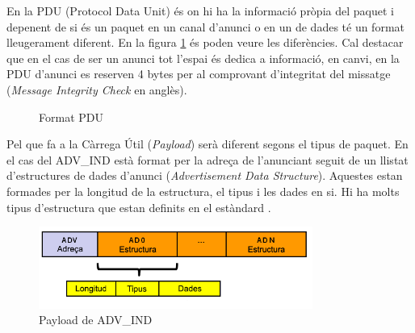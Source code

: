 En la PDU (Protocol Data Unit) és on hi ha la informació pròpia del paquet i depenent de si és un paquet en un canal d'anunci o en un de dades té un format lleugerament diferent.
En la figura \ref{fig:pdu_format} és poden veure les diferències.
Cal destacar que en el cas de ser un anunci tot l'espai és dedica a informació, en canvi, en la PDU d'anunci es reserven 4 bytes per al comprovant d'integritat del missatge (\textit{Message Integrity Check} en anglès).

\begin{figure}[!h]
	\begin{center}
		\begin{subfigmatrix}{1}
		\end{subfigmatrix}
	\end{center}
	\caption{Format PDU}
	\label{fig:pdu_format}
\end{figure}

Pel que fa a la Càrrega Útil (\textit{Payload}) serà diferent segons el tipus de paquet.
En el cas del ADV\_IND està format per la adreça de l'anunciant seguit de un llistat d'estructures de dades d'anunci (\textit{Advertisement Data Structure}).
Aquestes estan formades per la longitud de la estructura, el tipus i les dades en si.
Hi ha molts tipus d'estructura que estan definits en el estàndard \cite{AD_Types}.

\begin{figure}[!h]
	\begin{center}
		\includegraphics[width=0.8\textwidth]{./images/adv-ind-packet.png}
		\caption{Payload de ADV\_IND}
	\end{center}
\end{figure}

